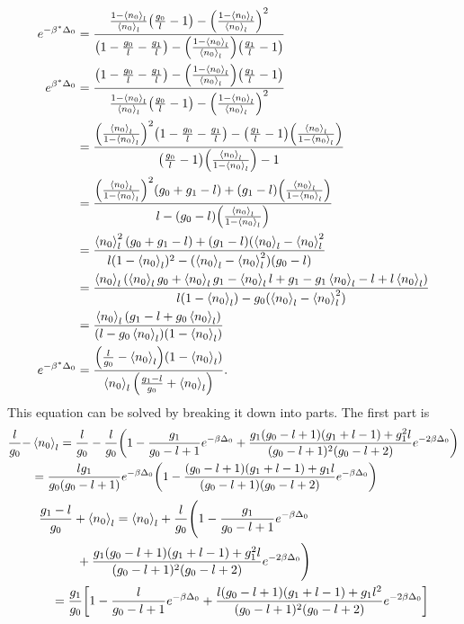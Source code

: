 \begin{align}
    e^{-\beta^*\Delta_0}&=\frac{\frac{1-\left<{n_0}\right>_l}{\left<{n_0}\right>_l}\qty(\frac{g_0}{l}-1)-\qty(\frac{1-\left<{n_0}\right>_l}{\left<{n_0}\right>_l})^2}{\qty(1-\frac{g_0}{l}-\frac{g_1}{l})-\qty(\frac{1-\left<{n_0}\right>_l}{\left<{n_0}\right>_l})\qty(\frac{g_1}{l}-1)}\\
    e^{\beta^*\Delta_0}&=\frac{\qty(1-\frac{g_0}{l}-\frac{g_1}{l})-\qty(\frac{1-\left<{n_0}\right>_l}{\left<{n_0}\right>_l})\qty(\frac{g_1}{l}-1)}{\frac{1-\left<{n_0}\right>_l}{\left<{n_0}\right>_l}\qty(\frac{g_0}{l}-1)-\qty(\frac{1-\left<{n_0}\right>_l}{\left<{n_0}\right>_l})^2}\nonumber\\
    &=\frac{\qty(\frac{\left<{n_0}\right>_l}{1-\left<{n_0}\right>_l})^2\qty(1-\frac{g_0}{l}-\frac{g_1}{l})-\qty(\frac{g_1}{l}-1)\qty(\frac{\left<{n_0}\right>_l}{1-\left<{n_0}\right>_l})}{\qty(\frac{g_0}{l}-1)\qty(\frac{\left<{n_0}\right>_l}{1-\left<{n_0}\right>_l})-1}\nonumber\\
    &=\frac{\qty(\frac{\left<{n_0}\right>_l}{1-\left<{n_0}\right>_l})^2(g_0+g_1-l)+(g_1-l)\qty(\frac{\left<{n_0}\right>_l}{1-\left<{n_0}\right>_l})}{l-(g_0-l)\qty(\frac{\left<{n_0}\right>_l}{1-\left<{n_0}\right>_l})}\nonumber\\
    &=\frac{\left<{n_0}\right>_l^2(g_0+g_1-l)+(g_1-l)(\left<{n_0}\right>_l-\left<{n_0}\right>_l^2}{l(1-\left<{n_0}\right>_l)^2-(\left<{n_0}\right>_l-\left<{n_0}\right>_l^2)(g_0-l)}\nonumber\\
    &=\frac{\left<{n_0}\right>_l(\left<{n_0}\right>_lg_0+\left<{n_0}\right>_lg_1-\left<{n_0}\right>_ll+g_1-g_1\left<{n_0}\right>_l-l+l\left<{n_0}\right>_l)}{l(1-\left<{n_0}\right>_l)-g_0(\left<{n_0}\right>_l-\left<{n_0}\right>_l^2)}\nonumber\\
    &=\frac{\left<{n_0}\right>_l(g_1-l+g_0\left<{n_0}\right>_l)}{(l-g_0\left<{n_0}\right>_l)(1-\left<{n_0}\right>_l)}\\
    e^{-\beta^*\Delta_0}&=\frac{\qty(\frac{l}{g_0}-\left<{n_0}\right>_l)\qty(1-\left<{n_0}\right>_l)}{\left<{n_0}\right>_l\qty(\frac{g_1-l}{g_0}+\left<{n_0}\right>_l)}.
\end{align}
This equation can be solved by breaking it down into parts. The first part is  
\begin{align}
    \frac{l}{g_0}-&\left<{n_0}\right>_l=\frac{l}{g_0}-\frac{l}{g_0}\qty(1-\frac{g_1}{g_0-l+1}e^{-\beta\Delta_0}+\frac{g_1(g_0-l+1)(g_1+l-1)+g_1^2 l}{(g_0-l+1)^2(g_0-l+2)} e^{-2\beta\Delta_0})\nonumber\\
    &=\frac{lg_1}{g_0(g_0-l+1)}e^{-\beta\Delta_0}\qty(1-\frac{(g_0-l+1)(g_1+l-1)+g_1l}{(g_0-l+1)(g_0-l+2)}e^{-\beta\Delta_0})\nonumber
\end{align}
\begin{align}
    &\frac{g_1-l}{g_0}+\left<{n_0}\right>_l=\left<{n_0}\right>_l+\frac{l}{g_0}\Biggr(1-\frac{g_1}{g_0-l+1}e^{-\beta\Delta_0}\nonumber\\
    &\quad\quad\quad+\frac{g_1(g_0-l+1)(g_1+l-1)+g_1^2 l}{(g_0-l+1)^2(g_0-l+2)} e^{-2\beta\Delta_0}\Biggr)\nonumber\\
    &\quad=\frac{g_1}{g_0}\qty[1-\frac{l}{g_0-l+1}e^{-\beta\Delta_0}+\frac{l(g_0-l+1)(g_1+l-1)+g_1l^2}{(g_0-l+1)^2(g_0-l+2)} e^{-2\beta\Delta_0}]
\end{align}
